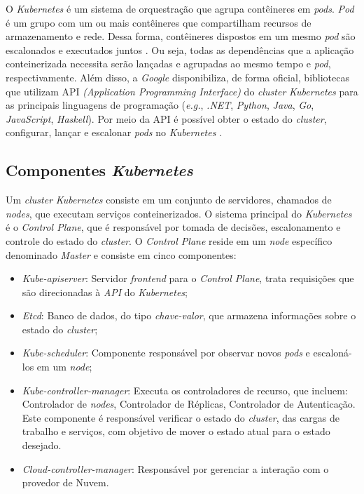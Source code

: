 \documentclass[
	12pt,				%
	openright,			%
	oneside,			%
	a4paper,			%
	brazil				%
	]{abntex2}
\begin{document}
O \textit{Kubernetes} é um sistema de orquestração que agrupa contêineres em \textit{pods}. \textit{Pod} é um grupo com um ou mais contêineres que compartilham recursos de armazenamento e rede. Dessa forma, contêineres dispostos em um mesmo \textit{pod} são escalonados e executados juntos \cite{Google}. Ou seja, todas as dependências que a aplicação conteinerizada necessita serão lançadas e agrupadas ao mesmo tempo e \textit{pod}, respectivamente. Além disso, a \textit{Google} disponibiliza, de forma oficial, bibliotecas que utilizam API \textit{(Application Programming Interface)} do \textit{cluster} \textit{Kubernetes}  para as principais linguagens de programação (\textit{e.g.}, \textit{.NET}, \textit{Python}, \textit{Java}, \textit{Go}, \textit{JavaScript}, \textit{Haskell}). Por meio da API é possível obter o estado do \textit{cluster}, configurar, lançar e escalonar \textit{pods} no \textit{Kubernetes} \cite{KubernetesAPI}.

\subsection{Componentes \textit{Kubernetes}}
Um \textit{cluster} \textit{Kubernetes} consiste em um conjunto de servidores, chamados de \textit{nodes}, que executam serviços conteinerizados. O sistema principal do \textit{Kubernetes} é o \textit{Control Plane}, que é responsável por tomada de decisões, escalonamento e controle do estado do \textit{cluster}. O \textit{Control Plane} reside em um \textit{node} específico denominado \textit{Master} e consiste em cinco componentes:

\begin{itemize}
    \item \textit{Kube-apiserver}: Servidor \textit{frontend} para o \textit{Control Plane}, trata requisições que são direcionadas à \textit{API} do \textit{Kubernetes};
    \item \textit{Etcd}: Banco de dados, do tipo \textit{chave-valor}, que armazena informações sobre o estado do \textit{cluster};
    \item \textit{Kube-scheduler}: Componente responsável por observar novos \textit{pods} e escaloná-los em um \textit{node};
    \item \textit{Kube-controller-manager}: Executa os controladores de recurso, que incluem: Controlador de \textit{nodes}, Controlador de Réplicas, Controlador de Autenticação. Este componente é responsável verificar o estado do \textit{cluster}, das cargas de trabalho e serviços, com objetivo de mover o estado atual para o estado desejado.
    \item \textit{Cloud-controller-manager}: Responsável por gerenciar a interação com o provedor de Nuvem.
\end{itemize}
\end{document}
